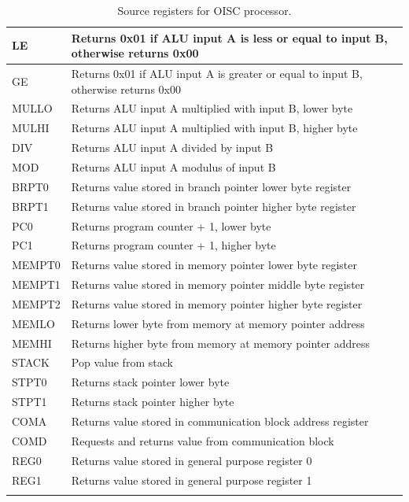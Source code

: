 \documentclass[a4paper,12pt]{article}
\begin{document}
\begin{longtable}[h!]{| l | p{} | }
	LE   & Returns 0x01 if ALU input A is less or equal to input B, otherwise returns 0x00\\\hline
	GE   & Returns 0x01 if ALU input A is greater or equal to input B, otherwise returns 0x00\\\hline
	MULLO& Returns ALU input A multiplied with input B, lower byte\\\hline
	MULHI& Returns ALU input A multiplied with input B, higher byte\\\hline
	DIV  & Returns ALU input A divided by input B\\\hline
	MOD  & Returns ALU input A modulus of input B\\\hline
	BRPT0& Returns value stored in branch pointer lower byte register\\\hline
	BRPT1& Returns value stored in branch pointer higher byte register\\\hline
	PC0 & Returns program counter + 1, lower byte\\\hline
	PC1 & Returns program counter + 1, higher byte\\\hline
	MEMPT0 & Returns value stored in memory pointer lower byte register \\\hline
	MEMPT1 & Returns value stored in memory pointer middle byte register \\\hline
	MEMPT2 & Returns value stored in memory pointer higher byte register \\\hline
	MEMLO & Returns lower byte from memory at memory pointer address \\\hline
	MEMHI & Returns higher byte from memory at memory pointer address \\\hline
	STACK & Pop value from stack\\\hline
	STPT0 & Returns stack pointer lower byte\\\hline
	STPT1 & Returns stack pointer higher byte\\\hline
	
	COMA & Returns value stored in communication block address register\\\hline
	COMD & Requests and returns value from communication block\\\hline
	REG0 & Returns value stored in general purpose register 0\\\hline
	REG1 & Returns value stored in general purpose register 1\\\hline
				
	\caption{Source registers for OISC processor.}
	\label{table:oisc_src_instr}
\end{longtable}	
\end{document}
